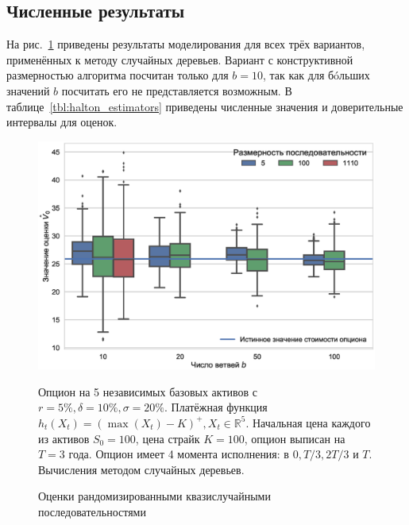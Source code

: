 \documentclass[specialist,
               substylefile = ../spbu.rtx,
               subf,href,colorlinks=true, 12pt]{disser}
\begin{document}

\subsection{Численные результаты} %
\label{sub:numerical_results}

На рис.~\ref{fig:halton_estimators} приведены результаты моделирования для всех трёх вариантов, применённых к методу случайных деревьев. Вариант с конструктивной размерностью алгоритма посчитан только для $b = 10$, так как для б\'oльших значений $b$ посчитать его не представляется возможным. В таблице~\ref{tbl:halton_estimators} приведены численные значения и доверительные интервалы для оценок.

\begin{figure}[h]
    \centering
	\includegraphics[width=\textwidth]{halton_estimators.eps}
	\caption{Оценки рандомизированными квазислучайными последовательностями}
	\footnotesize Опцион на 5 независимых базовых активов с $r = 5\%, \delta = 10\%, \sigma = 20\%$. Платёжная функция $h_t(X_t) = \left(\max(X_t) - K\right)^+, X_t\in \mathbb R^5$. Начальная цена каждого из активов $S_0 = 100$, цена страйк $K = 100$, опцион выписан на $T=3$ года. Опцион имеет 4 момента исполнения: в $0, T/3, 2T/3$ и $T$. Вычисления методом случайных деревьев.
	\label{fig:halton_estimators}
\end{figure}
\end{document}

